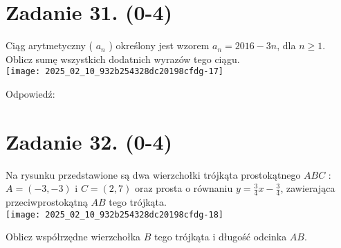 \documentclass[10pt]{article}
\begin{document}
\section*{Zadanie 31. (0-4)}
Ciąg arytmetyczny ( \(a_{n}\) ) określony jest wzorem \(a_{n}=2016-3 n\), dla \(n \geq 1\). Oblicz sumę wszystkich dodatnich wyrazów tego ciągu.\\
\texttt{[image: 2025\_02\_10\_932b254328dc20198cfdg-17]}

Odpowiedź: \(\qquad\)

\section*{Zadanie 32. (0-4)}
Na rysunku przedstawione są dwa wierzchołki trójkąta prostokątnego \(A B C\) : \(A=(-3,-3)\) i \(C=(2,7)\) oraz prosta o równaniu \(y=\frac{3}{4} x-\frac{3}{4}\), zawierająca przeciwprostokątną \(A B\) tego trójkąta.\\
\texttt{[image: 2025\_02\_10\_932b254328dc20198cfdg-18]}

Oblicz współrzędne wierzchołka \(B\) tego trójkąta i długość odcinka \(A B\).
\end{document}
